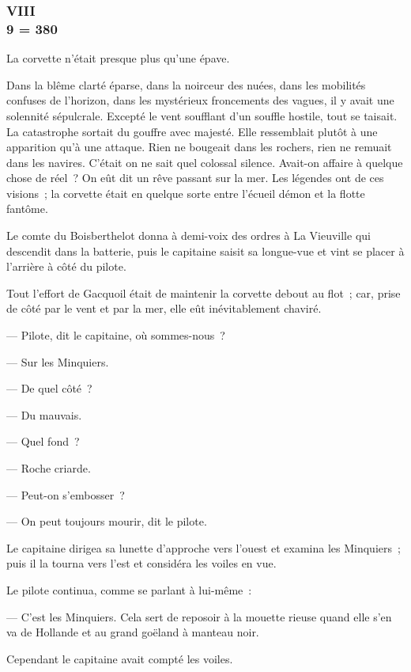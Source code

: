 \documentclass[french,twoside]{book} %
\begin{document}
 \subsubsection[{VIII, 9 = 380}]{VIII \\
9 = 380}
\label{p1l2c8}
\noindent La corvette n’était presque plus qu’une épave.\par
Dans la blême clarté éparse, dans la noirceur des nuées, dans les mobilités confuses de l’horizon, dans les mystérieux froncements des vagues, il y avait une solennité sépulcrale. Excepté le vent soufflant d’un souffle hostile, tout se taisait. La catastrophe sortait du gouffre avec majesté. Elle ressemblait plutôt à une apparition qu’à une attaque. Rien ne bougeait dans les rochers, rien ne remuait dans les navires. C’était on ne sait quel colossal silence. Avait-on affaire à quelque chose de réel ? On eût dit un rêve passant sur la mer. Les légendes ont de ces visions ; la corvette était en quelque sorte entre l’écueil démon et la flotte fantôme.\par
Le comte du Boisberthelot donna à demi-voix des ordres à La Vieuville qui descendit dans la batterie, puis le capitaine saisit sa longue-vue et vint se placer à l’arrière à côté du pilote.\par
Tout l’effort de Gacquoil était de maintenir la corvette debout au flot ; car, prise de côté par le vent et par la mer, elle eût inévitablement chaviré.\par
— Pilote, dit le capitaine, où sommes-nous ?\par
— Sur les Minquiers.\par
 — De quel côté ?\par
— Du mauvais.\par
— Quel fond ?\par
— Roche criarde.\par
— Peut-on s’embosser ?\par
— On peut toujours mourir, dit le pilote.\par
Le capitaine dirigea sa lunette d’approche vers l’ouest et examina les Minquiers ; puis il la tourna vers l’est et considéra les voiles en vue.\par
Le pilote continua, comme se parlant à lui-même :\par
— C’est les Minquiers. Cela sert de reposoir à la mouette rieuse quand elle s’en va de Hollande et au grand goëland à manteau noir.\par
Cependant le capitaine avait compté les voiles.\par
\end{document}
